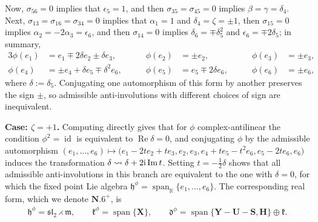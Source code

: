 \documentclass[pdftex]{sigma}
\DeclareMathOperator{\id} {id}
\DeclareMathOperator{\spanOperator}{span}
\renewcommand{\Im}{\operatorname{Im}}
\renewcommand{\Re}{\operatorname{Re}}
\newcommand{\Span}[1]{\spanOperator\{{#1}\}}
\newcommand{\bbR}{\mathbb{R}}
\newcommand{\mbH}{\mathbf{H}}
\newcommand{\mbS}{\mathbf{S}}
\newcommand{\mbU}{\mathbf{U}}
\newcommand{\mbX}{\mathbf{X}}
\newcommand{\mbY}{\mathbf{Y}}
\newcommand{\mfd} {\mathfrak{d}}
\newcommand{\mfh} {\mathfrak{h}}
\newcommand{\mfk} {\mathfrak{k}}
\newcommand{\mfm} {\mathfrak{m}}
\newcommand{\mfsl} {\mathfrak{sl}}
\numberwithin{equation}{section}
\begin{document}
Now, $\sigma_{56} = 0$ implies that $\epsilon_5 = 1$, and then $\sigma_{35} = \sigma_{45} = 0$ implies $\beta = \gamma = \delta_4$. Next, $\sigma_{13} = \sigma_{16} = \sigma_{34} = 0$ implies that $\alpha_1 = 1$ and $\delta_4 = \zeta = \pm 1$, then $\sigma_{15} = 0$ implies $\alpha_2 = -2 \alpha_3 = \epsilon_6$, and then $\sigma_{14} = 0$ implies $\delta_6 = \mp \delta_5^2$ and $\epsilon_6 = \mp 2 \delta_5$; in summary,
\begin{alignat*}{3}
	 \phi(e_1) &= e_1 \mp 2 \delta e_2 \pm \delta e_3, \qquad
	&\phi(e_2) &= \pm e_2, \qquad
	&\phi(e_3) &= \pm e_3, \\
	 \phi(e_4) &= \pm e_4 + \delta e_5 \mp \delta^2 e_6, \qquad
	&\phi(e_5) &= e_5 \mp 2 \delta e_6, \qquad
	&\phi(e_6) &= \pm e_6 ,
\end{alignat*}
where $\delta := \delta_5$. Conjugating one automorphism of this form by another preserves the sign $\pm$, so admissible anti-involutions with different choices of sign are inequivalent.

\smallskip
\noindent \textbf{Case: $\zeta = + 1$.} Computing directly gives that for $\phi$ complex-antilinear the condition $\phi^2 = \id$ is equivalent to $\Re \delta = 0$, and conjugating $\phi$ by the admissible automorphism $(e_1, \ldots, e_6) \mapsto \big(e_1 - 2 t e_2 + t e_3, e_2, e_3, e_4 + t e_5 - t^2 e_6, e_5 - 2 t e_6, e_6\big)$ induces the transformation $\delta \rightsquigarrow \delta + 2 {\rm i} \Im t$. Setting $t = -\frac{1}{2} \delta$ shows that all admissible anti-involutions in this branch are equivalent to the one with $\delta = 0$, for which the fixed point Lie algebra $\mfh^{\phi} = \spanOperator_{\bbR}\{e_1, \ldots, e_6\}$. The corresponding real form, which we denote $\mathbf{N.6}^+$, is
\begin{gather*}
	\boxed{
		\mfh^{\phi} = \mfsl_2 \rightthreetimes \mfm , \qquad
		\mfk^{\phi} = \Span{\mbX}, \qquad
		\mfd^{\phi} = \Span{\mbY - \mbU - \mbS, \mbH} \oplus \mfk .
	}
\end{gather*}
\end{document}
